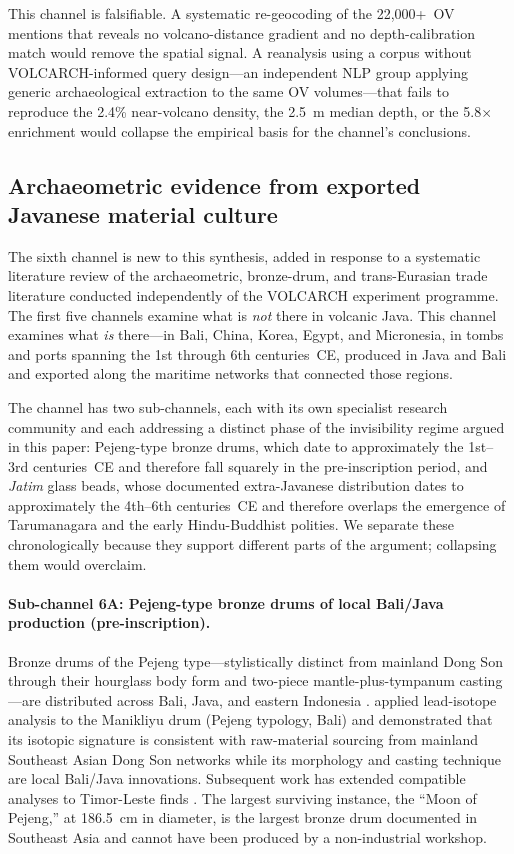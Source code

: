 \documentclass[12pt,a4paper]{article}
\begin{document}
This channel is falsifiable. A systematic re-geocoding of the 22{,}000+~OV mentions that reveals no volcano-distance gradient and no depth-calibration match would remove the spatial signal. A reanalysis using a corpus without VOLCARCH-informed query design---an independent NLP group applying generic archaeological extraction to the same OV volumes---that fails to reproduce the 2.4\% near-volcano density, the 2.5~m median depth, or the 5.8$\times$ enrichment would collapse the empirical basis for the channel's conclusions.


\subsection{Archaeometric evidence from exported Javanese material culture}
\label{sec:ch6}

The sixth channel is new to this synthesis, added in response to a systematic literature review of the archaeometric, bronze-drum, and trans-Eurasian trade literature conducted independently of the VOLCARCH experiment programme. The first five channels examine what is \textit{not} there in volcanic Java. This channel examines what \textit{is} there---in Bali, China, Korea, Egypt, and Micronesia, in tombs and ports spanning the 1st through 6th centuries~CE, produced in Java and Bali and exported along the maritime networks that connected those regions.

The channel has two sub-channels, each with its own specialist research community and each addressing a distinct phase of the invisibility regime argued in this paper: Pejeng-type bronze drums, which date to approximately the 1st--3rd centuries~CE and therefore fall squarely in the pre-inscription period, and \textit{Jatim} glass beads, whose documented extra-Javanese distribution dates to approximately the 4th--6th centuries~CE and therefore overlaps the emergence of Tarumanagara and the early Hindu-Buddhist polities. We separate these chronologically because they support different parts of the argument; collapsing them would overclaim.

\paragraph{Sub-channel 6A: Pejeng-type bronze drums of local Bali/Java production (pre-inscription).} Bronze drums of the Pejeng type---stylistically distinct from mainland Dong Son through their hourglass body form and two-piece mantle-plus-tympanum casting---are distributed across Bali, Java, and eastern Indonesia \citep{bernetkempers1988}. \citet{calo2014} applied lead-isotope analysis to the Manikliyu drum (Pejeng typology, Bali) and demonstrated that its isotopic signature is consistent with raw-material sourcing from mainland Southeast Asian Dong Son networks while its morphology and casting technique are local Bali/Java innovations. Subsequent work has extended compatible analyses to Timor-Leste finds \citep{calo2019}. The largest surviving instance, the ``Moon of Pejeng,'' at 186.5~cm in diameter, is the largest bronze drum documented in Southeast Asia and cannot have been produced by a non-industrial workshop.
\end{document}
